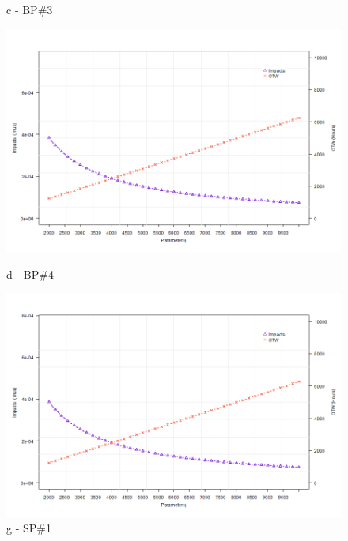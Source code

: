 \begin{figure}[!htb]
\begin{minipage}[b]{0.5\linewidth}
		\caption*{c - BP\#3}
	\end{minipage}
	\hspace{0.05cm}
	\begin{minipage}[b]{0.5\linewidth}
		\centering
		\includegraphics[width=\textwidth]{figures/ch05_fig_etasa_pump4}
		\caption*{d - BP\#4}
	\end{minipage}
	\hspace{0.05cm}
	\begin{minipage}[b]{0.5\linewidth}
		\centering
		\includegraphics[width=\textwidth]{figures/ch05_fig_etasa_pump5}
		\caption*{g -  SP\#1}
	\end{minipage}
	\hspace{0.05cm}
	\begin{minipage}[b]{0.5\linewidth}
		\centering

\end{minipage}
\end{figure}
